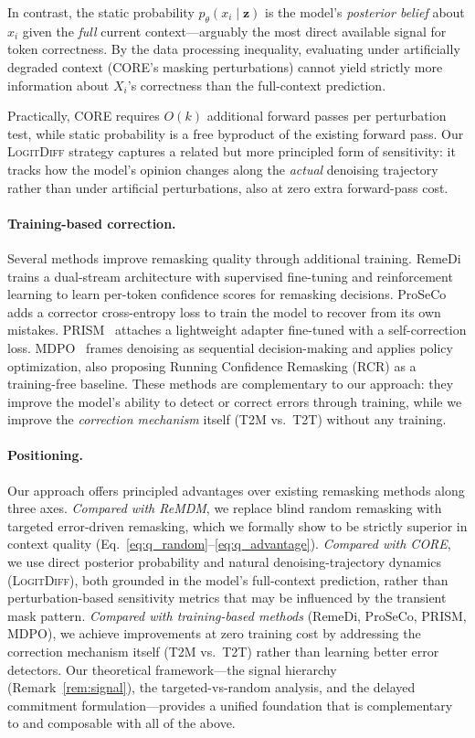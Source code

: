 \documentclass{article}
\begin{document}
In contrast, the static probability $p_\theta(x_i \mid \mathbf{z})$ is the model's \emph{posterior belief} about $x_i$ given the \emph{full} current context---arguably the most direct available signal for token correctness. By the data processing inequality, evaluating under artificially degraded context (CORE's masking perturbations) cannot yield strictly more information about $X_i$'s correctness than the full-context prediction.

Practically, CORE requires $O(k)$ additional forward passes per perturbation test, while static probability is a free byproduct of the existing forward pass. Our \textsc{LogitDiff} strategy captures a related but more principled form of sensitivity: it tracks how the model's opinion changes along the \emph{actual} denoising trajectory rather than under artificial perturbations, also at zero extra forward-pass cost.

\paragraph{Training-based correction.}
Several methods improve remasking quality through additional training. RemeDi~\citep{remedi2025} trains a dual-stream architecture with supervised fine-tuning and reinforcement learning to learn per-token confidence scores for remasking decisions. ProSeCo~\citep{schiff2026proseco} adds a corrector cross-entropy loss to train the model to recover from its own mistakes. PRISM~\citep{kim2025prism} attaches a lightweight adapter fine-tuned with a self-correction loss. MDPO~\citep{he2025mdpo} frames denoising as sequential decision-making and applies policy optimization, also proposing Running Confidence Remasking (RCR) as a training-free baseline. These methods are complementary to our approach: they improve the model's ability to detect or correct errors through training, while we improve the \emph{correction mechanism} itself (T2M vs.\ T2T) without any training.

\paragraph{Positioning.}
Our approach offers principled advantages over existing remasking methods along three axes. \emph{Compared with ReMDM}, we replace blind random remasking with targeted error-driven remasking, which we formally show to be strictly superior in context quality (Eq.~\ref{eq:q_random}--\ref{eq:q_advantage}). \emph{Compared with CORE}, we use direct posterior probability and natural denoising-trajectory dynamics (\textsc{LogitDiff}), both grounded in the model's full-context prediction, rather than perturbation-based sensitivity metrics that may be influenced by the transient mask pattern. \emph{Compared with training-based methods} (RemeDi, ProSeCo, PRISM, MDPO), we achieve improvements at zero training cost by addressing the correction mechanism itself (T2M vs.\ T2T) rather than learning better error detectors. Our theoretical framework---the signal hierarchy (Remark~\ref{rem:signal}), the targeted-vs-random analysis, and the delayed commitment formulation---provides a unified foundation that is complementary to and composable with all of the above.
\end{document}

